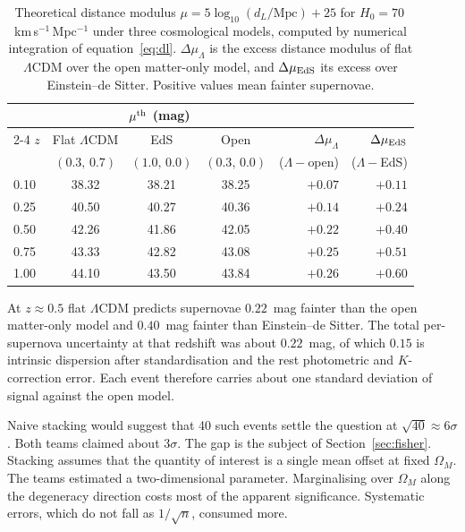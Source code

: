 \documentclass[12pt]{article}
\begin{document}
\begin{table}[ht]
\centering
\caption{Theoretical distance modulus $\mu = 5\log_{10}(d_L/\text{Mpc})+25$
for $H_0 = 70$\,km\,s$^{-1}$\,Mpc$^{-1}$ under three cosmological
models, computed by numerical integration of equation~\eqref{eq:dl}.
$\Delta\mu_\Lambda$ is the excess distance modulus of flat $\Lambda$CDM over
the open matter-only model, and $\Delta\mu_{\rm EdS}$ its excess over
Einstein--de Sitter.  Positive values mean fainter supernovae.}
\label{tab:mu_predictions}
\medskip
\begin{tabular}{lcccrr}
\toprule
 & \multicolumn{3}{c}{$\mu^{\rm th}$ (mag)} & & \\
\cmidrule{2-4}
$z$ & Flat $\Lambda$CDM & EdS & Open &
  $\Delta\mu_\Lambda$ & $\Delta\mu_{\rm EdS}$ \\
  & $(0.3,\,0.7)$ & $(1.0,\,0.0)$ & $(0.3,\,0.0)$ &
  ($\Lambda-$open) & ($\Lambda-$EdS) \\
\midrule
0.10 & 38.32 & 38.21 & 38.25 & $+0.07$ & $+0.11$ \\
0.25 & 40.50 & 40.27 & 40.36 & $+0.14$ & $+0.24$ \\
0.50 & 42.26 & 41.86 & 42.05 & $+0.22$ & $+0.40$ \\
0.75 & 43.33 & 42.82 & 43.08 & $+0.25$ & $+0.51$ \\
1.00 & 44.10 & 43.50 & 43.84 & $+0.26$ & $+0.60$ \\
\bottomrule
\end{tabular}
\end{table}

\noindent At $z \approx 0.5$ flat $\Lambda$CDM predicts supernovae
$0.22$~mag fainter than the open matter-only model and $0.40$~mag fainter
than Einstein--de Sitter.  The total per-supernova uncertainty at that
redshift was about $0.22$~mag, of which $0.15$ is intrinsic dispersion after
standardisation and the rest photometric and $K$-correction error.  Each
event therefore carries about one standard deviation of signal against the
open model.

Naive stacking would suggest that 40 such events settle the question at
$\sqrt{40} \approx 6\sigma$.  Both teams claimed about $3\sigma$.  The gap is
the subject of Section~\ref{sec:fisher}.  Stacking assumes that the quantity
of interest is a single mean offset at fixed $\Omega_M$.  The teams estimated
a two-dimensional parameter.  Marginalising over $\Omega_M$ along the
degeneracy direction costs most of the apparent significance.
Systematic errors, which do not fall as $1/\sqrt{n}$, consumed more.
\end{document}
